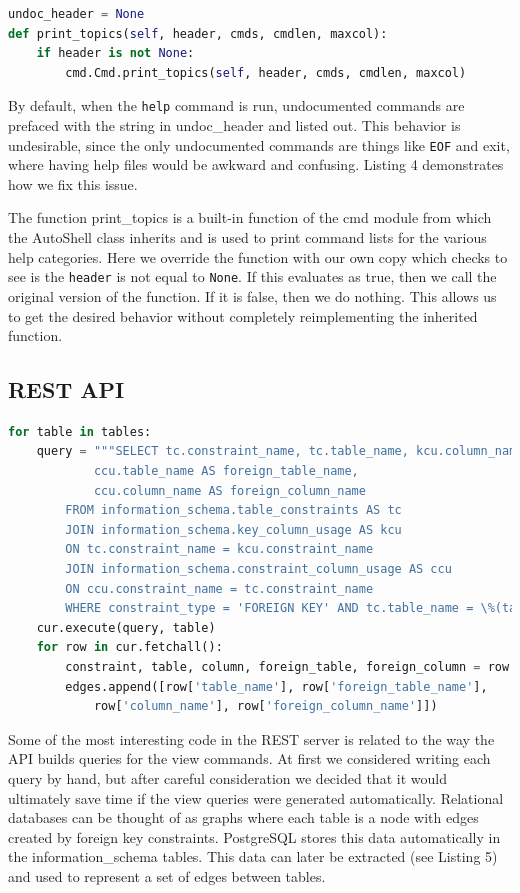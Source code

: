 \documentclass[10pt,draftclsnofoot,onecolumn]{IEEEtran}
\begin{document}
\begin{lstlisting}[language=Python, caption=CLI code responsible for hiding undocumented commands from help.]
undoc_header = None
def print_topics(self, header, cmds, cmdlen, maxcol):
	if header is not None:
		cmd.Cmd.print_topics(self, header, cmds, cmdlen, maxcol)
\end{lstlisting}

By default, when the \texttt{help} command is run, undocumented commands are
prefaced with the string in undoc\_header and listed out. This behavior is
undesirable, since the only undocumented commands are things like \texttt{EOF}
and exit, where having help files would be awkward and confusing. Listing 4
demonstrates how we fix this issue.

The function print\_topics is a built-in function of the cmd module from which
the AutoShell class inherits and is used to print command lists for the various
help categories. Here we override the function with our own copy which checks
to see is the \texttt{header} is not equal to \texttt{None}. If this evaluates
as true, then we call the original version of the function. If it is false,
then we do nothing. This allows us to get the desired behavior without
completely reimplementing the inherited function.

\subsection{REST API}

\begin{lstlisting}[language=Python, caption=Generating a list of edges for tables in a PostgreSQL database from the information schema tables.]
for table in tables:
	query = """SELECT tc.constraint_name, tc.table_name, kcu.column_name,
			ccu.table_name AS foreign_table_name,
			ccu.column_name AS foreign_column_name
		FROM information_schema.table_constraints AS tc
		JOIN information_schema.key_column_usage AS kcu
		ON tc.constraint_name = kcu.constraint_name
		JOIN information_schema.constraint_column_usage AS ccu
		ON ccu.constraint_name = tc.constraint_name
		WHERE constraint_type = 'FOREIGN KEY' AND tc.table_name = \%(tablename)s"""
	cur.execute(query, table)
	for row in cur.fetchall():
		constraint, table, column, foreign_table, foreign_column = row
		edges.append([row['table_name'], row['foreign_table_name'],
			row['column_name'], row['foreign_column_name']])
\end{lstlisting}
Some of the most interesting code in the REST server is related to the way the
API builds queries for the view commands. At first we considered writing each
query by hand, but after careful consideration we decided that it would
ultimately save time if the view queries were generated automatically.
Relational databases can be thought of as graphs where each table is a node
with edges created by foreign key constraints. PostgreSQL stores this data
automatically in the information\_schema tables. This data can later be
extracted (see Listing 5) and used to represent a set of edges between tables.
\end{document}
